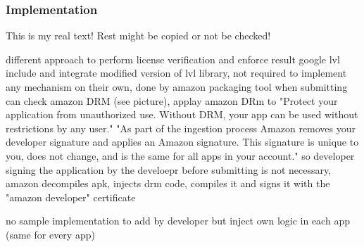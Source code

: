 \subsubsection{Implementation}\label{subsection:license-amazon-implementation}
This is my real text! Rest might be copied or not be checked!

%
different approach to perform license verification and enforce result
google lvl include and integrate modified version of lvl library, not required to implement any mechanism on their own, done by amazon packaging tool
when submitting can check amazon DRM (see picture), applay amazon DRm to "Protect your application from unauthorized use. Without DRM, your app can be used without restrictions by any user."
"As part of the ingestion process Amazon removes your developer signature and applies an Amazon signature. This signature is unique to you, does not change, and is the same for all apps in your account." so developer signing the application by the develoepr before submitting is not necessary, amazon decompiles apk, injects drm code, compiles it and signs it with the "amazon developer" certificate

no sample implementation to add by developer but inject own logic in each app (same for every app)
\cite{munteanLicense}
%
